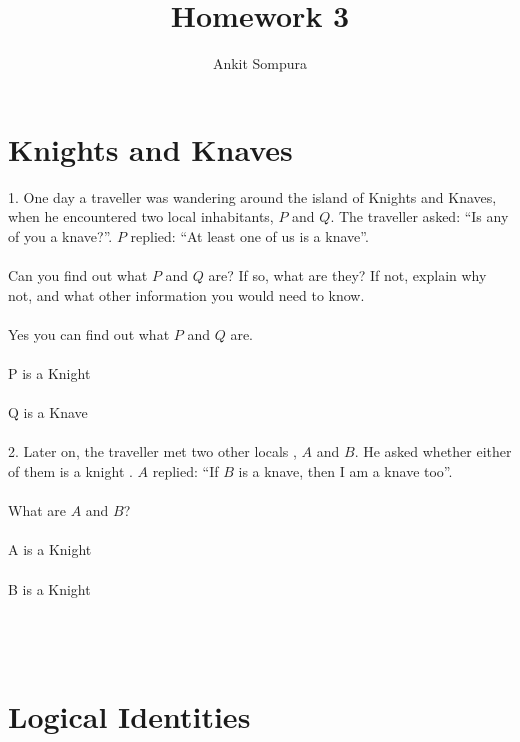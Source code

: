 \documentclass[11pt]{article}
\title{Homework 3}
\author{Ankit Sompura}
\begin{document}
\maketitle

\section{Knights and Knaves}

1. One day a traveller was wandering around the island of Knights and Knaves, when he encountered two local inhabitants, $P$ and $Q$.  The traveller asked:  “Is any of you a knave?”. $P$ replied:  “At least one of us is a knave”.\\\\

Can you find out what $P$ and $Q$ are?  If so, what are they?  If not, explain why not, and what other information you would need to know.\\\\

Yes you can find out what $P$ and $Q$ are.\\\\
P is a Knight \\\\
Q is a Knave \\\\





2. Later on, the traveller met two other locals , $A$ and $B$.  He asked whether either of them is a knight . $A$ replied:  “If $B$ is a knave, then I am a knave too”.\\\\


What are $A$ and $B$?\\\\
A is a Knight\\\\
B is a Knight\\\\ \\\\




\section{Logical Identities} 
\end{document}
